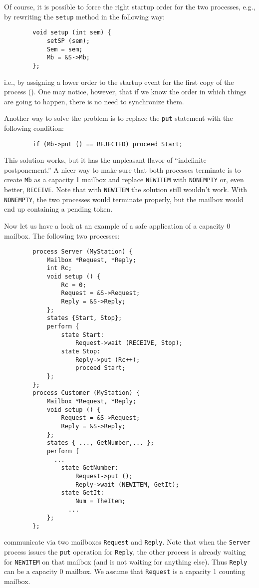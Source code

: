 Of course, it is possible to force the right startup order for the
two processes, e.g., by rewriting the {\tt setup} method in the following
way:
\begin{verbatim}
        void setup (int sem) {
            setSP (sem);
            Sem = sem;
            Mb = &S->Mb;
        };
\end{verbatim}
i.e., by assigning a lower order to the startup event for the first
copy of the process ().
One may notice, however, that if we know the order in which things are
going to happen, there is no need to synchronize them.

Another
way to solve the problem is to replace the {\tt put} statement with the
following condition:
\begin{verbatim}
        if (Mb->put () == REJECTED) proceed Start;
\end{verbatim}
This solution works, but it has the unpleasant flavor of ``indefinite
postponement.''
A nicer way to make sure that both processes terminate
is to create {\tt Mb} as a capacity 1 mailbox and replace
{\tt NEWITEM} with {\tt NONEMPTY} or, even better, {\tt RECEIVE}.
Note that with {\tt NEWITEM} the solution still wouldn't work.
With {\tt NONEMPTY}, the two processes would terminate properly,
but the mailbox would end up containing a pending token.

Now let us have a look at an example of a safe application of
a capacity 0 mailbox.
The following two processes:
\begin{verbatim}
        process Server (MyStation) {
            Mailbox *Request, *Reply;
            int Rc;
            void setup () {
                Rc = 0;
                Request = &S->Request;
                Reply = &S->Reply;
            };
            states {Start, Stop};
            perform {
                state Start:
                    Request->wait (RECEIVE, Stop);
                state Stop:
                    Reply->put (Rc++);
                    proceed Start;
            };
        };
        process Customer (MyStation) {
            Mailbox *Request, *Reply;
            void setup () {
                Request = &S->Request;
                Reply = &S->Reply;
            };
            states { ..., GetNumber,... };
            perform {
              ...
                state GetNumber:
                    Request->put ();
                    Reply->wait (NEWITEM, GetIt);
                state GetIt:
                    Num = TheItem;
                  ...
            };
        };
\end{verbatim}
communicate via two mailboxes {\tt Request} and {\tt Reply}.
Note that when the {\tt Server} process issues the {\tt put} operation for
{\tt Reply}, the other process is already waiting for {\tt NEWITEM} on
that mailbox (and is not waiting for anything else).
Thus {\tt Reply} can be a capacity 0 mailbox.
We assume that {\tt Request} is a capacity 1 counting mailbox.

